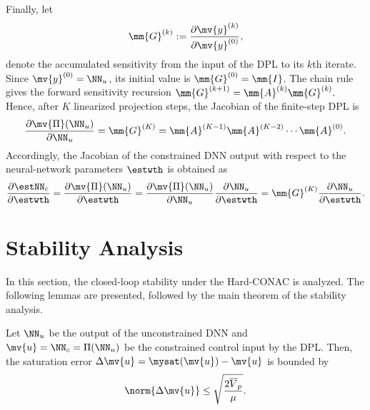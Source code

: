 Finally, let
\begin{equation}
  \mm{G}^{(k)}
  :=
  \frac{
    \partial\mv{y}^{(k)}
  }{
    \partial\mv{y}^{(0)}
  }
  ,
\end{equation}
denote the accumulated sensitivity from the input of the DPL to its $k$th iterate. Since $\mv{y}^{(0)}=\NN_u$, its initial value is $\mm{G}^{(0)}=\mm{I}$.
The chain rule gives the forward sensitivity recursion
$
  \mm{G}^{(k+1)}
  =
  \mm{A}^{(k)}\mm{G}^{(k)}
  .
$
Hence, after $K$ linearized projection steps, the Jacobian of the finite-step DPL is
\begin{equation}
  \label{CONAC:eq:DPL:Jacobian}
  \frac{
    \partial\mv{\Pi}(\NN_u)
  }{
    \partial\NN_u
  }
  =
  \mm{G}^{(K)}
  =
  \mm{A}^{(K-1)}
  \mm{A}^{(K-2)}
  \cdots
  \mm{A}^{(0)}
  .
\end{equation}
Accordingly, the Jacobian of the constrained DNN output with respect to the neural-network parameters $\estwth$ is obtained as
\begin{equation}
  \label{CONAC:eq:DPL:theta:Jacobian}
  \frac{
    \partial\estNN_c
  }{
    \partial\estwth
  }
  =
  \frac{
    \partial\mv{\Pi}(\NN_u)
  }{
    \partial\estwth
  }
  =
  \frac{
    \partial\mv{\Pi}(\NN_u)
  }{
    \partial\NN_u
  }
  \frac{
    \partial\NN_u
  }{
    \partial\estwth
  }
  =
  \mm{G}^{(K)}
  \frac{
    \partial\NN_u
  }{
    \partial\estwth
  }
  .
\end{equation}

\section{Stability Analysis}
\label{CONAC:sec:stability:analysis}

In this section, the closed-loop stability under the Hard-CONAC is analyzed.
The following lemmas are presented, followed by the main theorem of the stability analysis.

\begin{lem}
  \label{CONAC:lem:proj:sat:err:bound}
  Let $\NN_u$ be the output of the unconstrained DNN and $\mv{u}=\NN_c=\Pi(\NN_u)$ be the constrained control input by the DPL.
  Then, the saturation error $\Delta\mv{u}=\mysat(\mv{u}) - \mv{u}$ is bounded by
  \begin{equation}
    \norm{\Delta\mv{u}}
    \leq
    \sqrt{\frac{2\overline{V}_p}{\mu}}
    .
  \end{equation}
\end{lem}

